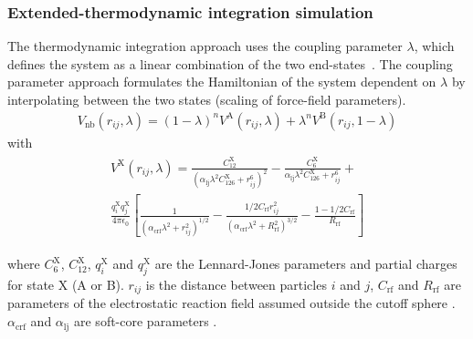 \subsubsection{Extended-thermodynamic integration simulation}
The thermodynamic integration approach uses the coupling parameter $\lambda$, which defines the system as a linear combination of the two end-states~\cite{kirkwood_TI}. The coupling parameter approach formulates the Hamiltonian of the system dependent on $\lambda$ by interpolating between the two states (scaling of force-field parameters). \\

\begin{align}
\label{equ:ext_ti}
V_{\text{nb}}(r_{ij},\lambda) = (1-\lambda)^n V^{\text{A}}(r_{ij},\lambda) + \lambda^n V^{\text{B}}(r_{ij},1-\lambda)
\end{align}
with
\begin{align}\begin{split}
V^{\text{X}}(r_{ij},\lambda) = \frac{C_{12}^{\text{X}}}{(\alpha_{\text{lj}}\lambda^2 C_{126}^{\text{X}} + r_{ij}^6)^2} - \frac{C_{6}^{\text{X}}}{\alpha_{\text{lj}}\lambda^2 C_{126}^{\text{X}} + r_{ij}^6} + \\
 \frac{q_i^{\text{X}} q_j^{\text{X}}}{4 \pi \epsilon_0} \left \lbrack \frac{1}{(\alpha_{\text{crf}}\lambda^2 + r_{ij}^2)^{1/2}} - \frac{1/2 C_{\text{rf}}r_{ij}^2}{(\alpha_{\text{crf}} \lambda^2 + R_{\text{rf}}^2)^{3/2}} - \frac{1 - 1/2C_{\text{rf}}}{R_{\text{rf}}} \right \rbrack
\end{split}\end{align}

\noindent where $C_{6}^{\text{X}}$, $C_{12}^{\text{X}}$, $q_i^{\text{X}}$ and $q_j^{\text{X}}$ are the Lennard-Jones parameters and partial charges for state X (A or B). $r_{ij}$ is the distance between particles $i$ and $j$, $C_{\text{rf}}$ and $R_{\text{rf}}$ are parameters of the electrostatic reaction field assumed outside the cutoff sphere \cite{Tironi1995}. 
$\alpha_{\text{crf}}$ and $\alpha_{\text{lj}}$ are soft-core parameters \cite{Beutler1994}. 

